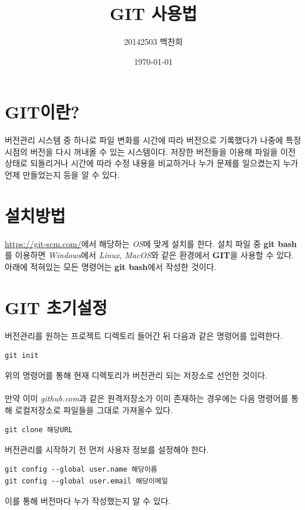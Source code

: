 \documentclass[letterpaper,12pt]{article}
\begin{document}
\title{GIT 사용법}
\author{20142503 백찬희}
\date{\today}
\maketitle

\section{GIT이란?}

버전관리 시스템 중 하나로 파일 변화를 시간에 따라 버전으로 기록했다가 나중에 특정 시점의 버전을 다시 꺼내올 수 있는 시스템이다. 
저장한 버전들을 이용해 파일을 이전 상태로 되돌리거나 시간에 따라 수정 내용을 비교하거나 누가 문제를 일으켰는지 누가 언제 만들었는지 등을 알 수 있다. 


\section{설치방법}

\href{https://git-scm.com/}{https://git-scm.com/}에서 해당하는 \textit{OS}에 맞게 설치를 한다. 설치 파일 중 \textbf{git bash}를 이용하면 \textit{Windows}에서 \textit{Linux}, \textit{MacOS}와 같은 환경에서 \textbf{GIT}을 사용할 수 있다. 아래에 적혀있는 모든 명령어는 \textbf{git bash}에서 작성한 것이다.

\section{GIT 초기설정}

버전관리를 원하는 프로젝트 디렉토리 들어간 뒤 다음과 같은 명령어를 입력한다.
\begin{verbatim}
git init
\end{verbatim} 
위의 명령어를 통해 현재 디렉토리가 버전관리 되는 저장소로 선언한 것이다.
\\\\만약 이미 \textit{github.com}과 같은 원격저장소가 이미 존재하는 경우에는 다음 명령어를 통해 로컬저장소로 파일들을 그대로 가져올수 있다.
\begin{verbatim}
git clone 해당URL
\end{verbatim} 
버전관리를 시작하기 전 먼저 사용자 정보를 설정해야 한다. 
\begin{verbatim}
git config --global user.name 해당이름
git config --global user.email 해당이메일
\end{verbatim} 
이를 통해 버전마다 누가 작성했는지 알 수 있다.

\clearpage
\end{document}
